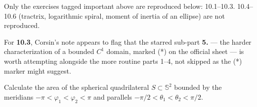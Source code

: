 \begin{ainote}
Only the exercises tagged important above are reproduced below: 10.1--10.3. 10.4--10.6
(tractrix, logarithmic spiral, moment of inertia of an ellipse) are not reproduced.
\end{ainote}

\begin{ainote}
For \textbf{10.3}, Corsin's note  appears to flag that the starred
sub-part \textbf{5.} --- the harder  characterization of a bounded $C^1$ domain,
marked (*) on the official sheet --- is worth attempting alongside the more routine parts
1--4, not skipped as the (*) marker might suggest.
\end{ainote}

\begin{exercise}
\label{ex:10.1}
Calculate the area of the spherical quadrilateral $S \subset \mathbb{S}^2$ bounded by the
meridians $-\pi < \varphi_1 < \varphi_2 < \pi$ and parallels $-\pi/2 < \theta_1 < \theta_2 <
\pi/2$.
\end{exercise}

